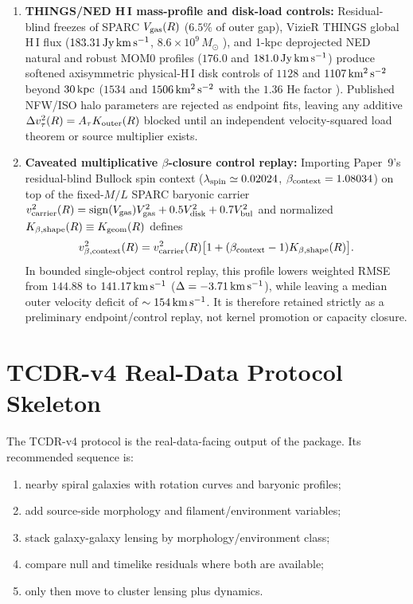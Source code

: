 \documentclass[11pt]{article}
\begin{document}
\begin{enumerate}
  \item \textbf{THINGS/NED H\,I mass-profile and disk-load controls:}
  Residual-blind freezes of SPARC \(V_{\rm gas}(R)\) (\(6.5\%\) of outer gap),
  VizieR THINGS global H\,I flux (\(183.31\,{\rm Jy\,km\,s^{-1}}\),
  \(8.6\times 10^9\,M_\odot\) \cite{Walter2008THINGS}), and 1-kpc deprojected
  NED natural and robust MOM0 profiles (\(176.0\) and
  \(181.0\,{\rm Jy\,km\,s^{-1}}\)) produce softened axisymmetric physical-H\,I
  disk controls of \(1128\) and \(1107\,{\rm km^2\,s^{-2}}\) beyond
  \(30\,{\rm kpc}\) (\(1534\) and \(1506\,{\rm km^2\,s^{-2}}\) with the
  \(1.36\) He factor \cite{Leroy2008SFE}).  Published NFW/ISO halo parameters
  are rejected as endpoint fits, leaving any additive
  \(\Delta v_\tau^2(R)=A_\tau K_{\rm outer}(R)\) blocked until an independent
  velocity-squared load theorem or source multiplier exists.

  \item \textbf{Caveated multiplicative \(\beta\)-closure control replay:}
  Importing Paper~9's residual-blind Bullock spin context
  (\(\lambda_{\rm spin}\simeq 0.02024\), \(\beta_{\rm context}=1.08034\)) on top
  of the fixed-\(M/L\) SPARC baryonic carrier
  \(v_{\rm carrier}^2(R)=\operatorname{sign}(V_{\rm gas})V_{\rm gas}^2+0.5V_{\rm disk}^2+0.7V_{\rm bul}^2\)
  and normalized \(K_{\beta,{\rm shape}}(R)\equiv K_{\rm geom}(R)\) defines
  \begin{equation}
    v_{\beta,{\rm context}}^2(R)
    =v_{\rm carrier}^2(R)\bigl[1+(\beta_{\rm context}-1)K_{\beta,{\rm shape}}(R)\bigr].
  \end{equation}
  In bounded single-object control replay, this profile lowers weighted RMSE
  from \(144.88\) to \(141.17\,{\rm km\,s^{-1}}\) (\(\Delta=-3.71\,{\rm km\,s^{-1}}\)),
  while leaving a median outer velocity deficit of \(\sim 154\,{\rm km\,s^{-1}}\).
  It is therefore retained strictly as a preliminary endpoint/control replay,
  not kernel promotion or capacity closure.
\end{enumerate}

\section{TCDR-v4 Real-Data Protocol Skeleton}

The TCDR-v4 protocol is the real-data-facing output of the package.  Its
recommended sequence is:
\begin{enumerate}
  \item nearby spiral galaxies with rotation curves and baryonic profiles;
  \item add source-side morphology and filament/environment variables;
  \item stack galaxy-galaxy lensing by morphology/environment class;
  \item compare null and timelike residuals where both are available;
  \item only then move to cluster lensing plus dynamics.
\end{enumerate}
\end{document}
